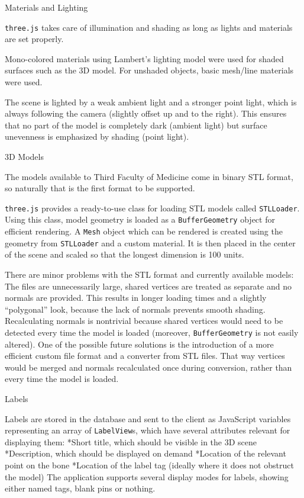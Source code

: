 \secc Materials and Lighting

{\tt three.js} takes care of illumination and shading as long as lights and materials are set properly.

Mono-colored materials using Lambert’s lighting model were used for shaded surfaces such as the 3D model. For unshaded objects, basic mesh/line materials were used.

The scene is lighted by a weak ambient light and a stronger point light, which is always following the camera (slightly offset up and to the right). This ensures that no part of the model is completely dark (ambient light) but surface unevenness is emphasized by shading (point light).

\secc 3D Models

The models available to Third Faculty of Medicine come in binary STL format, so naturally that is the first format to be supported.

{\tt three.js} provides a ready-to-use class for loading STL models called {\tt STLLoader}. Using this class, model geometry is loaded as a {\tt BufferGeometry} object for efficient rendering. A {\tt Mesh} object which can be rendered is created using the geometry from {\tt STLLoader} and a custom material. It is then placed in the center of the scene and scaled so that the longest dimension is 100 units.

There are minor problems with the STL format and currently available models: The files are unnecessarily large, shared vertices are treated as separate and no normals are provided. This results in longer loading times and a slightly “polygonal” look, because the lack of normals prevents smooth shading. Recalculating normals is nontrivial because shared vertices would need to be detected every time the model is loaded (moreover, {\tt BufferGeometry} is not easily altered). One of the possible future solutions is the introduction of a more efficient custom file format and a converter from STL files. That way vertices would be merged and normals recalculated once during conversion, rather than every time the model is loaded.

\secc Labels

Labels are stored in the database and sent to the client as JavaScript variables representing an array of {\tt LabelView}s, which have several attributes relevant for displaying them:
\begitems
*Short title, which should be visible in the 3D scene
*Description, which should be displayed on demand
*Location of the relevant point on the bone
*Location of the label tag (ideally where it does not obstruct the model)
\enditems
The application supports several display modes for labels, showing either named tags, blank pins or nothing.

